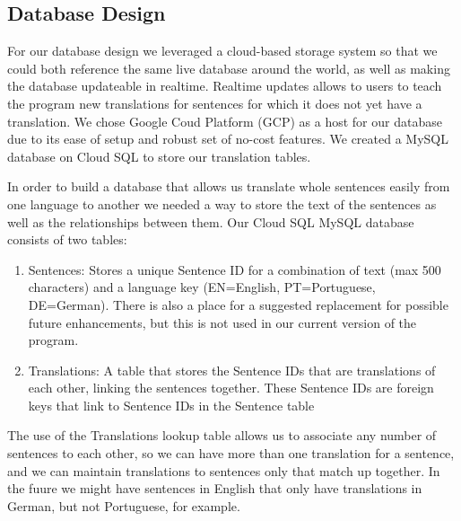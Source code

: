 \documentclass[runningheads]{llncs}
\begin{document}
	\subsection{Database Design}
	For our database design we leveraged a cloud-based storage system so that we could both reference the same live database around the world, as well as making the database updateable in realtime. Realtime updates allows to users to teach the program new translations for sentences for which it does not yet have a translation. We chose Google Coud Platform (GCP) as a host for our database due to its ease of setup and robust set of no-cost features. We created a MySQL database on Cloud SQL to store our translation tables.
	
	In order to build a database that allows us translate whole sentences easily from one language to another we needed a way to store the text of the sentences as well as the relationships between them. Our Cloud SQL MySQL database consists of two tables:
			
		\begin{enumerate}
			\item Sentences: Stores a unique Sentence ID for a combination of text (max 500 characters) and a language key (EN=English, PT=Portuguese, DE=German). There is also a place for a suggested replacement for possible future enhancements, but this is not used in our current version of the program.
			\item Translations: A table that stores the Sentence IDs that are translations of each other, linking the sentences together. These Sentence IDs are foreign keys that link to Sentence IDs in the Sentence table
		\end{enumerate}

	The use of the Translations lookup table allows us to associate any number of sentences to each other, so we can have more than one translation for a sentence, and we can maintain translations to sentences only that match up together. In the fuure we might have sentences in English that only have translations in German, but not Portuguese, for example. 	

	\begin{minipage}{\linewidth}
			\hspace*{-.25in}
  			 \noindent{}
			\label{fig:Database Diagrams}
			\vspace*{1cm}
	\end{minipage}
	\afterpage{\clearpage}
\end{document}
